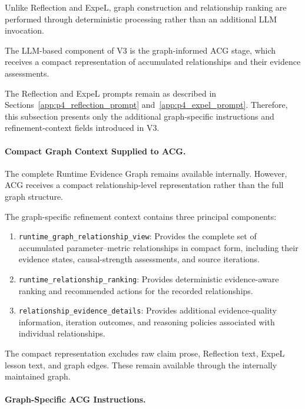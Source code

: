 Unlike Reflection and ExpeL, graph construction
and relationship ranking are performed through
deterministic processing rather than an
additional LLM invocation.

The LLM-based component of V3 is the
graph-informed ACG stage, which receives
a compact representation of accumulated
relationships and their evidence assessments.

The Reflection and ExpeL prompts remain
as described in
Sections~\ref{app:p4_reflection_prompt}
and~\ref{app:p4_expel_prompt}.
Therefore, this subsection presents only
the additional graph-specific instructions
and refinement-context fields introduced
in V3.

\paragraph{Compact Graph Context Supplied to ACG.}

The complete Runtime Evidence Graph remains
available internally. However, ACG receives
a compact relationship-level representation
rather than the full graph structure.

The graph-specific refinement context
contains three principal components:

\begin{enumerate}

\item \texttt{runtime\_graph\_relationship\_view}:
Provides the complete set of accumulated
parameter--metric relationships in compact
form, including their evidence states,
causal-strength assessments, and
source iterations.

\item \texttt{runtime\_relationship\_ranking}:
Provides deterministic evidence-aware
ranking and recommended actions for
the recorded relationships.

\item \texttt{relationship\_evidence\_details}:
Provides additional evidence-quality
information, iteration outcomes,
and reasoning policies associated
with individual relationships.

\end{enumerate}

The compact representation excludes
raw claim prose, Reflection text,
ExpeL lesson text, and graph edges.
These remain available through the
internally maintained graph.

\paragraph{Graph-Specific ACG Instructions.}

